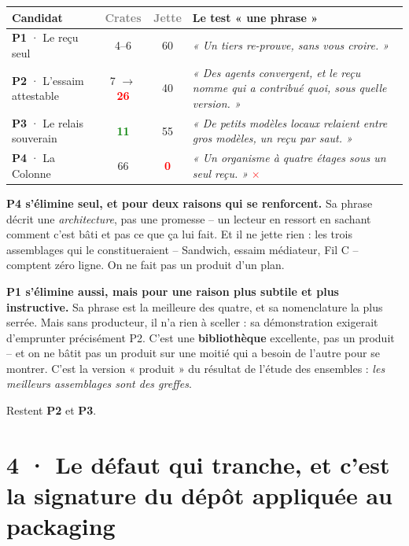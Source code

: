 \documentclass[10pt]{article}
\newcommand{\best}[1]{\textcolor{green}{\textbf{#1}}}
\newcommand{\pire}[1]{\textcolor{red}{\textbf{#1}}}
\newcommand{\sz}[1]{\textcolor{grey}{\small\textsf{#1}}}
\begin{document}
\renewcommand{\arraystretch}{1.2}
\begin{center}\small
\begin{tabular}{@{}>{\raggedright\arraybackslash}p{3.5cm} c c >{\raggedright\arraybackslash}p{8.1cm}@{}}
\toprule
\textbf{Candidat} & \sz{Crates} & \sz{Jette} & \textbf{Le test « une phrase »} \\
\midrule
\textbf{P1} · Le reçu seul & 4--6 & 60 & \emph{« Un tiers re-prouve, sans vous croire. »} \best{\checkmark} \\
\textbf{P2} · L'essaim attestable & 7 $\rightarrow$ \pire{26} & 40 & \emph{« Des agents convergent, et le reçu nomme qui a contribué quoi, sous quelle version. »} \best{\checkmark} \\
\textbf{P3} · Le relais souverain & \best{11} & 55 & \emph{« De petits modèles locaux relaient entre gros modèles, un reçu par saut. »} \best{\checkmark} \\
\textbf{P4} · La Colonne & 66 & \pire{0} & \emph{« Un organisme à quatre étages sous un seul reçu. »} \pire{$\times$} \\
\bottomrule
\end{tabular}
\end{center}

\textbf{P4 s'élimine seul, et pour deux raisons qui se renforcent.} Sa phrase décrit une
\emph{architecture}, pas une promesse -- un lecteur en ressort en sachant comment c'est bâti et pas ce
que ça lui fait. Et il ne jette rien : les trois assemblages qui le constitueraient
-- Sandwich, essaim médiateur, Fil C -- comptent zéro ligne. On ne fait pas un produit d'un plan.

\textbf{P1 s'élimine aussi, mais pour une raison plus subtile et plus instructive.} Sa phrase est la
meilleure des quatre, et sa nomenclature la plus serrée. Mais sans producteur, il n'a rien à sceller :
sa démonstration exigerait d'emprunter précisément P2. C'est une \textbf{bibliothèque} excellente, pas
un produit -- et on ne bâtit pas un produit sur une moitié qui a besoin de l'autre pour se montrer.
C'est la version « produit » du résultat de l'étude des ensembles : \emph{les meilleurs assemblages
sont des greffes}.

Restent \textbf{P2} et \textbf{P3}.

\section{4 · Le défaut qui tranche, et c'est la signature du dépôt appliquée au packaging}
\end{document}
